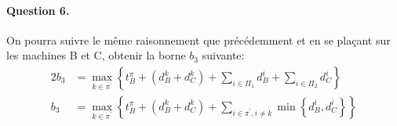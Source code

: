 \documentclass[a4paper, 10pt]{article}
\begin{document}
		\paragraph{Question 6.}{On pourra suivre le même raisonnement que précédemment et en se plaçant sur les machines B et C, obtenir la borne $b_3$ suivante:
		\begin{alignat*}{2}
			b_3 &= \max_{k \in \pi^\prime} \left\{ t^{\pi}_B + \left( d^k_B + d^k_C \right) + \sum_{i \in \Pi_1} d^i_B + \sum_{i \in \Pi_2} d^i_C \right\} \\
			b_3 &= \max_{k \in \pi^\prime} \left\{ t^{\pi}_B + \left( d^k_B + d^k_C \right) + \sum_{i \in \pi^\prime, i \ne k} \min \left\{ d^i_B, d^i_C \right\} \right\}
		\end{alignat*}
		}
\end{document}
